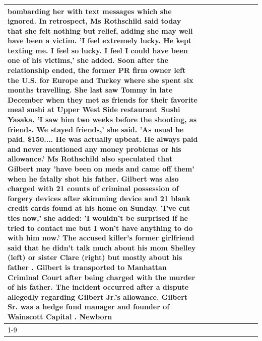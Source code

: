 \begin{table}[H]
\begin{tabular}{lllrlllll}
bombarding her with text messages which she ignored. In retrospect, Ms Rothschild said today that she felt nothing but relief, adding she may well have been a victim. 'I feel extremely lucky. He kept texting me. I feel so lucky. I feel I could have been one of his victims,' she added. Soon after the relationship ended, the former PR firm owner left the U.S. for Europe and Turkey where she spent six months  travelling. She last saw Tommy in late December when they met as friends for their favorite meal sushi at Upper West Side restaurant Sushi Yasaka. 'I saw him two weeks before the shooting, as friends. We stayed friends,' she said. 'As usual he paid. \$150.... He was actually upbeat. He always paid and never mentioned any money problems or his allowance.' Ms Rothschild also speculated that Gilbert may 'have been on meds and came off them' when he fatally shot his father. Gilbert was also charged with 21 counts of criminal possession of forgery devices after skimming device and 21 blank credit cards found at his home on Sunday. 'I've cut ties now,' she added: 'I wouldn’t be surprised if he tried to contact me but I won’t have anything to do with him now.' The accused killer's former girlfriend said that he didn't talk much about his mom Shelley (left) or sister Clare (right) but mostly about his father . Gilbert is transported to Manhattan Criminal Court  after being charged with the murder of his father. The incident occurred after a dispute allegedly regarding Gilbert Jr.'s allowance. Gilbert Sr. was a hedge fund manager and founder of Wainscott Capital . Newborn \\
\cline{1-9}

\end{tabular}
\end{table}
